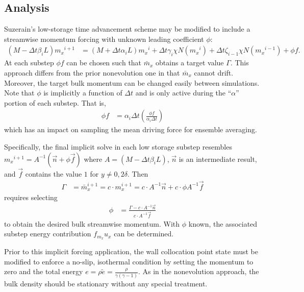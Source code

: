\documentclass[letterpaper,11pt,nointlimits,reqno]{amsart}
\begin{document}
\subsection{Analysis}

Suzerain's low-storage time advancement scheme may be modified to include a
streamwise momentum forcing with unknown leading coefficient $\phi$:
\begin{align}
  \left(M - \Delta{}t\beta_{i}L\right) {m_x}^{i+1}
  &=
  \left(M + \Delta{}t\alpha_{i}L\right) {m_x}^{i}
  + \Delta{}t\gamma_{i}\chi{}N\left({m_x}^{i}\right)
  + \Delta{}t\zeta_{i-1}\chi{}N\left({m_x}^{i-1}\right)
  + \phi{} f
  .
\end{align}
At each substep $\phi{} f$ can be chosen such that $\bar{m}_x$ obtains a target
value $\Gamma$.  This approach differs from the prior nonevolution one in that
$\bar{m}_x$ cannot drift.  Moreover, the target bulk momentum can be changed
easily between simulations.  Note that $\phi$ is implicitly a function of
$\Delta{}t$ and is only active during the ``$\alpha$'' portion of each substep.
That is,
\begin{align} %
  \phi{} f &= \alpha_i \Delta{}t \left(\frac{\phi{}f}{\alpha_i\Delta{}t}\right)
\end{align}
which has an impact on sampling the mean driving force for ensemble
averaging.

Specifically, the final implicit solve in each low storage substep resembles
${m_x}^{i+1} = A^{-1}\left(\vec{n} + \phi\vec{f}\right)$ where $A = \left(M -
\Delta{}t\beta_{i}L\right)$, $\vec{n}$ is an intermediate result, and $\vec{f}$
contains the value $1$ for $y\neq{}0,2\delta$.  Then
\begin{align}
\Gamma &= \bar{m}_x^{i+1}
        = c \cdot m_x^{i+1}
        = c \cdot{} A^{-1}\vec{n} + c \cdot{} \phi{}A^{-1}\vec{f}
\end{align}
requires selecting
\begin{align}
  \phi &= \frac{\Gamma - c \cdot{} A^{-1} \vec{n}}{c \cdot{} A^{-1} \vec{f}}
  \label{eq:phitarget}
\end{align}
to obtain the desired bulk streamwise momentum.  With $\phi$ known, the
associated substep energy contribution $f_{m_x} u_{x}$ can be determined.

Prior to this implicit forcing application, the wall collocation point state
must be modified to enforce a no-slip, isothermal condition by setting the
momentum to zero and the total energy $e = \rho \tilde{e} =
\frac{\rho}{\gamma\left(\gamma-1\right)}$.  As in the nonevolution approach,
the bulk density should be stationary without any special treatment.
\end{document}
